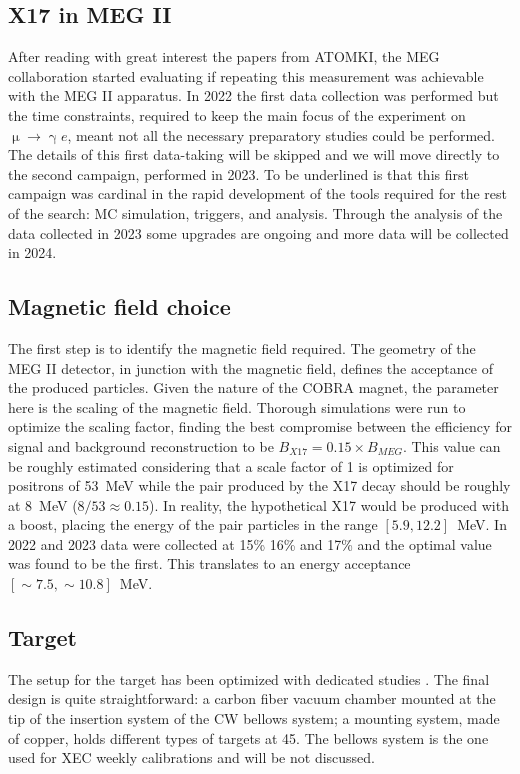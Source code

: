 \begin{refsection}
\section{X17 in MEG II}
    After reading with great interest the papers from ATOMKI, the MEG collaboration started evaluating if repeating this measurement was achievable with the MEG II apparatus.
    In 2022 the first data collection was performed but the time constraints, required to keep the main focus of the experiment on $\upmu \rightarrow \upgamma e$, meant not all the necessary preparatory studies could be performed.
    The details of this first data-taking will be skipped and we will move directly to the second campaign, performed in 2023. 
    To be underlined is that this first campaign was cardinal in the rapid development of the tools required for the rest of the search: MC simulation, triggers, and analysis.
    Through the analysis of the data collected in 2023 some upgrades are ongoing and more data will be collected in 2024.
        
    \subsection{Magnetic field choice}
        The first step is to identify the magnetic field required. 
        The geometry of the MEG II detector, in junction with the magnetic field, defines the acceptance of the produced particles.
        Given the nature of the COBRA magnet, the parameter here is the scaling of the magnetic field.
        Thorough simulations were run to optimize the scaling factor, finding the best compromise between the efficiency for signal and background reconstruction to be $B_{X17}=0.15\times B_{MEG}$. 
        This value can be roughly estimated considering that a scale factor of 1 is optimized for positrons of \SI{53}{MeV} while the pair produced by the X17 decay should be roughly at \SI{8}{MeV} ($8/53\approx 0.15$). 
        In reality, the hypothetical X17 would be produced with a boost, placing the energy of the pair particles in the range $[5.9,12.2]$~MeV.
        In 2022 and 2023 data were collected at 15\% 16\% and 17\% and the optimal value was found to be the first.
        This translates to an energy acceptance $[\sim7.5,\sim10.8]$~MeV.
        
    \subsection{Target}
        The setup for the target has been optimized with dedicated studies \cite{X17:Meucci}. 
        The final design is quite straightforward: a carbon fiber vacuum chamber mounted at the tip of the insertion system of the CW bellows system; a mounting system, made of copper, holds different types of targets at \SI{45}{\deg}.
        The bellows system is the one used for XEC weekly calibrations and will be not discussed.
        

\end{refsection}
